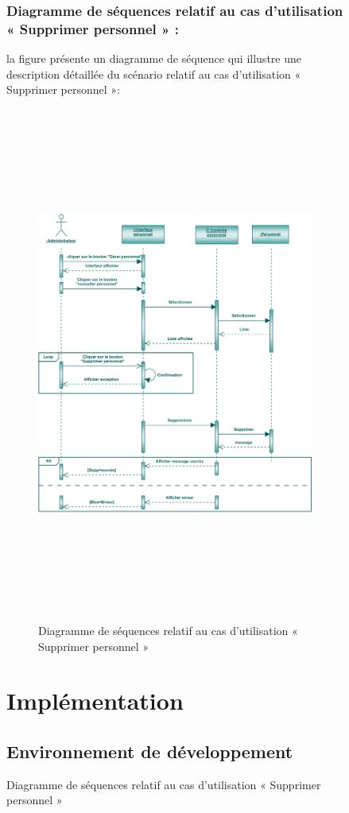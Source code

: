 \documentclass[12 pt]{report}
\begin{document}
\begin{figure}[h]
\begin{center}
\subsubsection{Diagramme de séquences relatif au cas d’utilisation « Supprimer personnel » :}
la figure   présente un diagramme de séquence qui illustre une description détaillée du scénario relatif au cas d’utilisation « Supprimer personnel »: 
{\begin{figure}[h]
 \begin{center}
\includegraphics[width= 18 cm ,height=  17cm]{sec_sup_per.PNG}
\caption{Diagramme de séquences relatif au cas d’utilisation « Supprimer personnel  »}

\end{center}
\end{figure}}
\newpage
\section{Implémentation}
\subsection{Environnement de développement}


\end{center}
\end{figure}
\end{document}
